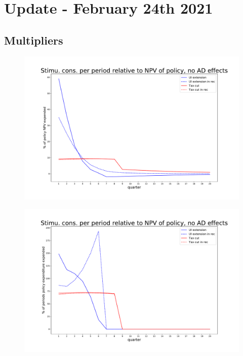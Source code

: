 \documentclass[]{article}
\begin{document}
	
\section{Update - February 24th 2021}	
\FloatBarrier
\subsection{Multipliers}

\begin{figure}
	\centering
	\includegraphics[width=\linewidth]{../Full_Run_with_UI_Ext/NPV_Multiplier_no_AD}
	\caption{}
	\label{fig:npvmultipliernoad}
\end{figure}


\begin{figure}
	\centering
	\includegraphics[width=\linewidth]{../Full_Run_with_UI_Ext/Period_Multiplier_no_AD}
	\caption{}
	\label{fig:periodmultipliernoad}
\end{figure}
\end{document}
